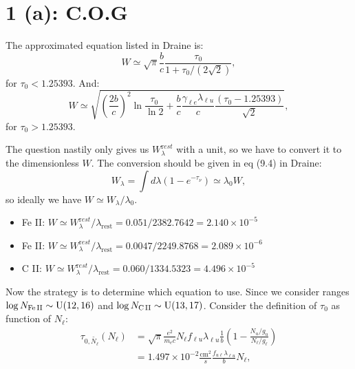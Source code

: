 \documentclass[12pt,letterpaper]{article}
\newcommand{\mt}{\mathrm}
\newcommand{\uniform}{\textrm{U}}
\newcommand{\EWrest}{W^{\mt rest}_\lambda}
\newcommand{\lambdarest}{\lambda_{\textrm{rest}}}
\newcommand{\FeII}{\textrm{Fe\,II}}
\newcommand{\CII}{\textrm{C\,II}}
\newcommand{\columndensity}{N_\ell}
\newcommand{\columndensityrv}{\tilde{\columndensity}}
\begin{document}
\section*{1 (a): C.O.G}

The approximated equation listed in Draine is:
\begin{equation}
    W \simeq \sqrt{\pi} \frac{b}{c} 
    \frac{\tau_0 }{1 + \tau_0 / (2\sqrt{2})},
\end{equation}
for $\tau_0 < 1.25393$.
And:
\begin{equation}
    W \simeq
    \sqrt{ 
        (\frac{2b}{c})^2 \ln{\frac{\tau_0}{\ln{2}}} +
        \frac{b}{c} \frac{\gamma_{\ell e}\lambda_{\ell u}}{c}
        \frac{(\tau_0 - 1.25393)}{\sqrt{2}}
     },
\end{equation}
for $\tau_0 > 1.25393$.

The question nastily only gives us $W^{\mt rest}_\lambda$ with a unit,
so we have to convert it to the dimensionless $W$.
The conversion should be given in eq (9.4) in Draine:
\begin{equation*}
    W_\lambda = \int d\lambda (1 - e^{-\tau_\nu}) \simeq \lambda_0 W,
\end{equation*}
so ideally we have $W \simeq W_\lambda / \lambda_0$.

\begin{itemize}
    \item Fe II: $W \simeq \EWrest / \lambdarest = 0.051 / 2382.7642 = 2.140 \times 10^{-5}$
    \item Fe II: $W \simeq \EWrest / \lambdarest =  0.0047 / 2249.8768 = 2.089 \times 10^{-6}$
    \item C II:  $W \simeq \EWrest / \lambdarest =  0.060 / 1334.5323 = 4.496 \times 10^{-5}$
\end{itemize}

Now the strategy is to determine which equation to use.
Since we consider ranges $\log{N_{\FeII}} \sim \uniform(12, 16)$ and $\log{N_{\CII}} \sim \uniform(13, 17)$.
Consider the definition of $\tau_0$ as function of $N_\ell$:
\begin{equation}
    \begin{split}
        \tau_{0, \columndensityrv}(\columndensity)
        &= \sqrt{\pi}\frac{e^2}{m_e c} \columndensity
        f_{\ell u} \lambda_{\ell u} \frac{1}{b}(1 - \frac{N_u / g_u}{N_\ell / g_\ell})\\
        &= 1.497 \times 10^{-2} \frac{\mt{cm}^2}{s} \frac{f_{u \ell}\lambda_{\ell u}}{b} N_\ell,
    \end{split}
    \label{eq:tau_0}
\end{equation}
\end{document}
